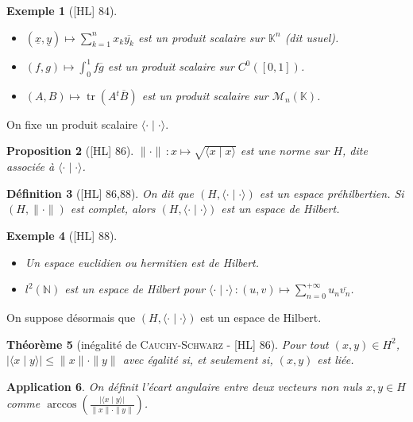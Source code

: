 \documentclass[10pt, a4paper, parskip=full, twoside, twocolumn]{report}
\newtheorem{definition}{Définition}
\newtheorem{theorem}[definition]{Théorème}
\newtheorem{proposition}[definition]{Proposition}
\newtheorem{example}[definition]{Exemple}
\newtheorem{application}[definition]{Application}
\newcommand{\IN}{\mathbb{N}}
\newcommand{\IK}{\mathbb{K}}
\newcommand{\M}{\mathcal{M}}
\newcommand{\ps}[2]{\langle #1\mid #2\rangle}
\DeclareMathOperator{\tr}{tr}
\begin{document}
\begin{example}[\textnormal{[HL] 84}]
	\begin{itemize}
		\item $(\underline{x},\underline{y})\mapsto \sum_{k=1}^{n} x_k\overline{y_k}$ est un produit scalaire sur $\IK^n$ (dit \emph{usuel}).
		\item $(f,g)\mapsto\int_{0}^{1} f\overline{g}$ est un produit scalaire sur $C^0([0,1])$.
		\item $(A,B)\mapsto \tr(A{}^t\overline{B})$ est un produit scalaire sur $\M_n(\IK)$.
	\end{itemize}
\end{example}

\textcolor{paragraphtext}{On fixe un produit scalaire $\ps{\cdot}{\cdot}$.}

\begin{proposition}[\textnormal{[HL] 86}]
	$\|\cdot\|\,\colon x\mapsto\sqrt{\ps{x}{x}}$ est une norme sur $H$, dite \emph{associée à $\ps{\cdot}{\cdot}$.}
\end{proposition}

\begin{definition}[\textnormal{[HL] 86,88}]
	On dit que $(H,\ps{\cdot}{\cdot})$ est un \emph{espace préhilbertien}.
	Si $(H, \|\cdot\|)$ est complet, alors $(H,\ps{\cdot}{\cdot})$ est un \emph{espace de Hilbert}.
\end{definition}

\begin{example}[\textnormal{[HL] 88}]
	\begin{itemize}
		\item Un espace euclidien ou hermitien est de Hilbert.
		\item $l^2(\IN)$ est un espace de Hilbert pour $\ps{\cdot}{\cdot}\,\colon (u,v)\mapsto\sum_{n=0}^{+\infty} u_n\overline{v_n}$.
	\end{itemize}
\end{example}

\textcolor{paragraphtext}{On suppose désormais que $(H, \ps{\cdot}{\cdot})$ est un espace de Hilbert.}

\begin{theorem}[inégalité de \textsc{Cauchy-Schwarz} - \textnormal{[HL] 86}]
	Pour tout $(x,y)\in H^2$, $\vert \ps{x}{y}\vert \leq \|x\|\cdot\|y\|$ avec égalité si, et seulement si, $(x,y)$ est liée.
\end{theorem}

\begin{application}
	On définit l'\emph{écart angulaire} entre deux vecteurs non nuls $x,y\in H$ comme $\arccos\left(\frac{\vert \ps{x}{y}\vert}{\|x\|\cdot\|y\|}\right)$.
\end{application}
\end{document}

